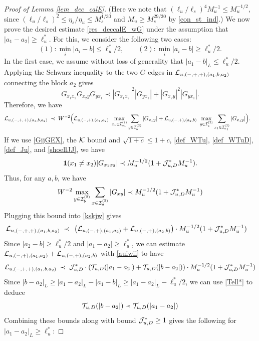 \begin{proof}[Proof of Lemma \ref{lem_dec_calE}]
(Here we note that $(\ell_u/\ell_s)^{4}M_u^{-1}\leq M_u^{-1/2}$, since $(\ell_u/\ell_s)^{2}\leq\eta_s/\eta_u\leq M_s^{1/30}$ and $M_u\geq M_s^{29/30}$ by \eqref{con_st_ind}.) We now prove the desired estimate \eqref{res_deccalE_wG} under the assumption that $|a_1-a_2|\ge \ell_u^*$. For this, we consider the following two cases:
 $$
 (1): \min_i|a_i-b|\le \ell_u^*/2,\quad \quad 
 (2): \min_i|a_i-b|\ge \ell_u^*/2.
 $$
In the first case,  we assume without loss of generality that $|a_1-b|_{L}\le \ell_u^*/2$. Applying the Schwarz inequality to  the two $G$ edges  in ${\cal L}_{u, (-,+,+),(a_1, b , a_2)}$ connecting the block $a_2$ gives
$$
G_{x_1x_2}G_{x_2y}G_{yx_1}\prec |G_{x_1x_2}|^2|G_{yx_1}|+
|G_{ x_2 y}|^2|G_{yx_1}|.
$$
Therefore, we have
\begin{align}\label{kskjw}
  {\cal L}_{u, (-,+,+),(a_1, b , a_2)}
  \;\prec\; &\;  W^{-2} \Big ( {\cal L}_{u, (-,+),(a_1, a_2)} \ \max_{x_1\in {\cal I}^{(2)}_{a_1}}\sum_{y\in {\cal I}^{(2)}_{b}}|G_{x_1y}|+ {\cal L}_{u, (-,+),(a_2, b)}\ \max_{y\in {\cal I}^{(2)}_{b}}\sum_{x_1\in {\cal I}^{(2)}_{a_1}}|G_{x_1y}| \Big )  .
\end{align}
If we use \eqref{GijGEX},  the $\cal K$ bound and $\sqrt { 1+c } \le 1+c $, \eqref{def_WTu}, \eqref{def_WTuD}, \eqref{def_Ju}, and \eqref{shoellJJ},  we have
$$
{\bf 1}(x_1\ne x_2)|G_{x_1x_2}|\prec M_{u}^{-1/2}(1+{\cal J}^*_{u,D}M_{u}^{-1}).
$$
Thus, for any $a,b$, we have 
\begin{align}\label{jaysw2002}
  W^{-2}  \max_{y\in{\cal I}_b^{(2)}}\sum_{x\in{\cal I}_a^{(2)}}|G_{xy}|\prec M_{u}^{-1/2}(1+{\cal J}^*_{u,D}M_{u}^{-1})
\end{align}
Plugging this bound  into \eqref{kskjw} gives 
\begin{align}
  {\cal L}_{u, (-,+,+),(a_1, b , a_2)}
     \;\prec\; &\;\left( {\cal L}_{u, (-,+),(a_1, a_2)}   + {\cal L}_{u, (-,+),(a_2, b)}  \right)  \cdot M_{u}^{-1/2}(1+{\cal J}^*_{u,D}M_{u}^{-1})
\end{align}
 Since $|a_2-b|\ge \ell_u^*/2$ and $|a_1-a_2|\ge  \ell_u^*$,  we can estimate  $ {\cal L}_{u, (-,+),(a_1, a_2)}   + {\cal L}_{u, (-,+),(a_2, b)}$ 
with \eqref{auiwii} to have  
$$
 {\cal L}_{u, (-,+,+),(a_1, b , a_2)} \;\prec\; {\cal J}^*_{u,D}\cdot \left(  {\cal T}_{u,D}(|a_1-a_2|)+{\cal T}_{u,D}(|b-a_2|) \right)  \cdot M_{u}^{-1/2}(1+{\cal J}^*_{u,D}M_{u}^{-1})
 $$
Since $|b-a_2|_{L}\ge |a_1-a_2|_{L}-|a_1-b|_{L}\ge |a_1-a_2|_{L}-\ell_u^*/2$, we can use \eqref{Tell*} to deduce
$${\cal T}_{u,D}(|b-a_2|) \prec  {\cal T}_{u,D}(|a_1-a_2|)
$$
Combining these bounds along with bound ${\cal J}^{*}_{u,D}\geq1$ gives the following for $|a_1-a_2|_{L}\ge \ell_u^*$:

\end{proof}
